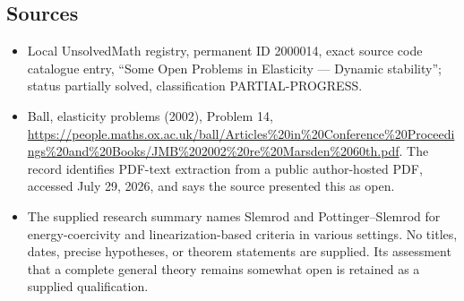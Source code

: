 \documentclass[11pt]{article}
\begin{document}
\subsection{Sources}
\begin{itemize}
\item Local UnsolvedMath registry, permanent ID 2000014, exact source code catalogue entry, ``Some Open Problems in Elasticity --- Dynamic stability''; status partially solved, classification PARTIAL-PROGRESS.
\item Ball, elasticity problems (2002), Problem 14, \url{https://people.maths.ox.ac.uk/ball/Articles%20in%20Conference%20Proceedings%20and%20Books/JMB%202002%20re%20Marsden%2060th.pdf}. The record identifies PDF-text extraction from a public author-hosted PDF, accessed July 29, 2026, and says the source presented this as open.
\item The supplied research summary names Slemrod and Pottinger--Slemrod for energy-coercivity and linearization-based criteria in various settings. No titles, dates, precise hypotheses, or theorem statements are supplied. Its assessment that a complete general theory remains somewhat open is retained as a supplied qualification.
\end{itemize}
\end{document}
